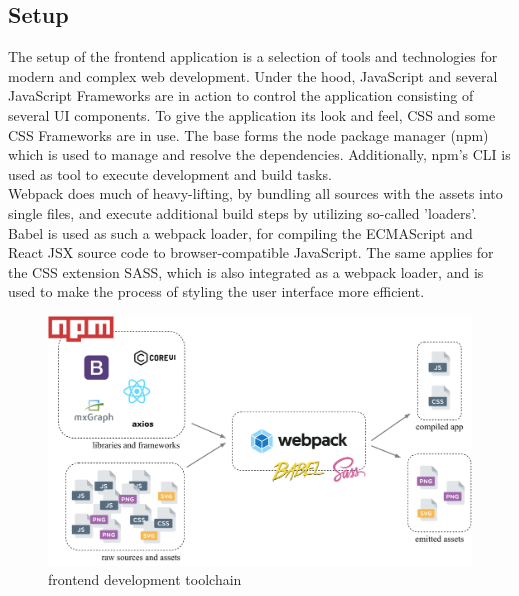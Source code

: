 \documentclass[a4paper,11pt,pdftex,halfparskip,cleardoubleempty,bibtotoc,liststotoc]{scrbook}
\begin{document}

\subsection{Setup}

The setup of the frontend application is a selection of tools and technologies for modern and complex web development.
Under the hood, JavaScript and several JavaScript Frameworks are in action to control the application consisting of several UI components. To give the application its look and feel, CSS and some CSS Frameworks are in use.
The base forms the node package manager (npm) which is used to manage and resolve the dependencies. Additionally, npm's CLI is used as tool to execute development and build tasks. \\
Webpack does much of heavy-lifting, by bundling all sources with the assets into single files, and execute additional build steps by utilizing so-called 'loaders'.
Babel is used as such a webpack loader, for compiling the ECMAScript and React JSX source code to browser-compatible JavaScript.
The same applies for the CSS extension SASS, which is also integrated as a webpack loader, and is used to make the process of styling the user interface more efficient.


\begin{figure}[htbp]
  \centering
  \vspace{0.8cm}
  \includegraphics[width=\textwidth]{frontend-setup}
  \caption{frontend development toolchain}
\end{figure}
\end{document}
